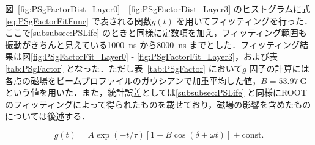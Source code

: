 図~\ref{fig:PSgFactorDist_Layer0} - \ref{fig:PSgFactorDist_Layer3} のヒストグラムに式\eqref{eq:PSgFactorFitFunc} で表される関数$g(t)$ を用いてフィッティングを行った．ここで\ref{subsubsec:PSLife} のときと同様に定数項を加え，フィッティング範囲も振動がきちんと見えている1000~ns から8000~ns までとした．フィッティング結果は図\ref{fig:PSgFactorFit_Layer0} - \ref{fig:PSgFactorFit_Layer3}，および表\ref{tab:PSgFactor} となった．ただし表~\ref{tab:PSgFactor} において$g$ 因子の計算には各点の磁場をビームプロファイルのガウシアンで加重平均した値，$B = 53.97~\mathrm{G}$ という値を用いた．また，統計誤差としては\ref{subsubsec:PSLife} と同様にROOT のフィッティングによって得られたものを載せており，磁場の影響を含めたものについては後述する．

\begin{equation}
g(t) = A \exp(-t / \tau) [1 + B \cos(\delta + \omega t)] + \mathrm{const.}
\label{eq:PSgFactorFitFunc}
\end{equation}

